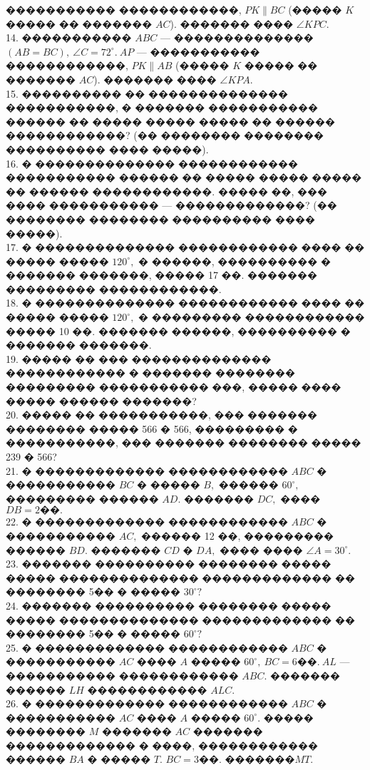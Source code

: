 \documentclass[12pt]{article}
\begin{document}
����������� ������������, $PK\parallel BC$ (����� $K$ ����� �� ������� $AC$). ������� ���� $\angle KPC.$\\
14. ����������� $ABC$ --- �������������� $(AB=BC),\ \angle C=72^\circ.\ AP$ ---
����������� ������������, $PK\parallel AB$ (����� $K$ ����� �� ������� $AC$). ������� ���� $\angle KPA.$\\
15. ���������� �� �������������� �����������, � ������� ����������� ������ �� ����� ����� ����� �� ������ ������������? (�� �������� �������� ���������� ���� �����).\\
16. � �������������� ������������ ����������� ������ �� ����� ����� ����� �� ������ ������������. ����� ��, ��� ���� ����������� --- �������������? (�� �������� �������� ���������� ���� �����).\\
17. � �������������� ������������ ���� �� ����� ����� $120^\circ,$ � ������, ���������� � ������� �������, ����� 17 ��. ������� ��������� ������������.\\
18. � �������������� ������������ ���� �� ����� ����� $120^\circ,$ � ��������� ������������ ����� 10 ��. ������� ������, ���������� � ������� �������.\\
19. ����� �� ��� �������������� ������������ � ������� �������� ��������� ����������� ���, ����� ���� ����� ������ �������?\\
20. ����� �� �����������, ��� ������� �������� ����� 566 � 566, ��������� � �����������, ��� ������� �������� ����� 239 � 566?\\
21. � ������������� ������������ $ABC$ � ����������� $BC$ � ����� $B,$ ������ $60^\circ,$ ��������� ������ $AD.$ ������� $DC,$ ���� $DB=2\text{��}.$\\
22. � ������������� ������������ $ABC$ � ����������� $AC,$ ������ 12 ��, ��������� ������ $BD.$ ������� $CD$ � $DA,$ ���� ���� $\angle A=30^\circ.$\\
23. ������� ���������� �������� ����� ����� �������������� ������������� �� �������� 5�� � ����� $30^\circ ?$\\
24. ������� ���������� �������� ����� ����� �������������� ������������� �� �������� 5�� � ����� $60^\circ ?$\\
25. � ������������� ������������ $ABC$ � ����������� $AC$ ���� $A$ ����� $60^\circ,\ BC=6\text{��}.\ AL$ --- ����������� ������������ $ABC.$ ������� ������ $LH$ ������������ $ALC.$\\
26. � ������������� ������������ $ABC$ � ����������� $AC$ ���� $A$ ����� $60^\circ.$ ����� �������� $M$ ������� $AC$ ������� ������������� � ����, ������������ ������ $BA$ � ����� $T.$ $BC=3\text{��}.$ �������$MT.$\\
\end{document}
